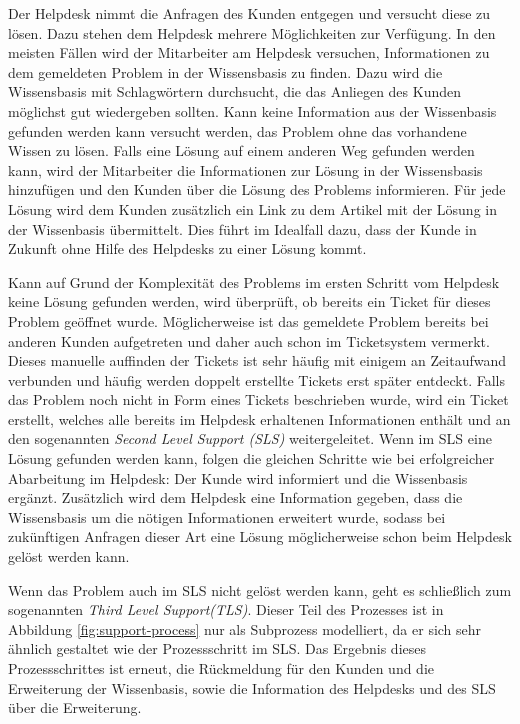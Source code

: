 Der Helpdesk nimmt die Anfragen des Kunden entgegen und versucht diese zu lösen. Dazu stehen dem Helpdesk mehrere Möglichkeiten zur Verfügung. In den meisten Fällen wird der Mitarbeiter am Helpdesk versuchen, Informationen zu dem gemeldeten Problem in der Wissensbasis zu finden. Dazu wird die Wissensbasis mit Schlagwörtern durchsucht, die das Anliegen des Kunden möglichst gut wiedergeben sollten. Kann keine Information aus der Wissenbasis gefunden werden kann versucht werden, das Problem ohne das vorhandene Wissen zu lösen. Falls eine Lösung auf einem anderen Weg gefunden werden kann, wird der Mitarbeiter die Informationen zur Lösung in der Wissensbasis hinzufügen und den Kunden über die Lösung des Problems informieren. Für jede Lösung wird dem Kunden zusätzlich ein Link zu dem Artikel mit der Lösung in der Wissenbasis übermittelt. Dies führt im Idealfall dazu, dass der Kunde in Zukunft ohne Hilfe des Helpdesks zu einer Lösung kommt.

Kann auf Grund der Komplexität des Problems im ersten Schritt vom Helpdesk keine Lösung gefunden werden, wird überprüft, ob bereits ein Ticket für dieses Problem geöffnet wurde. Möglicherweise ist das gemeldete Problem bereits bei anderen Kunden aufgetreten und daher auch schon im Ticketsystem vermerkt. Dieses manuelle auffinden der Tickets ist sehr häufig mit einigem an Zeitaufwand verbunden und häufig werden doppelt erstellte Tickets erst später entdeckt. Falls das Problem noch nicht in Form eines Tickets beschrieben wurde, wird ein Ticket erstellt, welches alle bereits im Helpdesk erhaltenen Informationen enthält und an den sogenannten \textit{Second Level Support (SLS)} weitergeleitet. Wenn im SLS eine Lösung gefunden werden kann, folgen die gleichen Schritte wie bei erfolgreicher Abarbeitung im Helpdesk: Der Kunde wird informiert und die Wissenbasis ergänzt. Zusätzlich wird dem Helpdesk eine Information gegeben, dass die Wissensbasis um die nötigen Informationen erweitert wurde, sodass bei zukünftigen Anfragen dieser Art eine Lösung möglicherweise schon beim Helpdesk gelöst werden kann.

Wenn das Problem auch im SLS nicht gelöst werden kann, geht es schließlich zum sogenannten \textit{Third Level Support(TLS)}. Dieser Teil des Prozesses ist in Abbildung \ref{fig:support-process} nur als Subprozess modelliert, da er sich sehr ähnlich gestaltet wie der Prozessschritt im SLS. Das Ergebnis dieses Prozessschrittes ist erneut, die Rückmeldung für den Kunden und die Erweiterung der Wissenbasis, sowie die Information des Helpdesks und des SLS über die Erweiterung.

